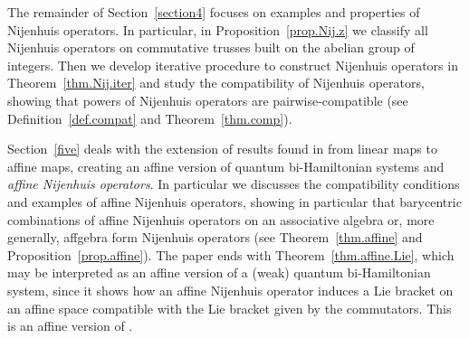 \documentclass[10pt,a4paper]{amsart}
\numberwithin{equation}{section}
\begin{document}
The remainder of Section~\ref{section4} focuses on examples and properties of Nijenhuis operators.
In particular, in Proposition~\ref{prop.Nij.z} we classify all Nijenhuis operators on commutative trusses built on the abelian group of integers. Then we develop iterative procedure to construct Nijenhuis operators in Theorem~\ref{thm.Nij.iter} and study the compatibility of Nijenhuis operators, showing that powers of Nijenhuis operators are pairwise-compatible (see Definition~\ref{def.compat} and Theorem~\ref{thm.comp}).

Section~\ref{five} deals with the extension of results found in \cite{4} from linear maps to affine maps, creating an affine version of quantum bi-Hamiltonian systems and \textit{affine Nijenhuis operators}.
In particular we discusses the compatibility conditions and examples of affine Nijenhuis operators, showing in particular that barycentric combinations of affine Nijenhuis operators on an associative algebra or, more generally, affgebra form Nijenhuis operators (see Theorem~\ref{thm.affine} and Proposition~\ref{prop.affine}). The paper ends with Theorem~\ref{thm.affine.Lie}, which may be interpreted as an affine version of a (weak) quantum bi-Hamiltonian system, since it shows how an affine Nijenhuis operator induces a Lie bracket on an affine space compatible with the Lie bracket given by the commutators. This is an affine version of \cite[Theorem~8]{4}.
\end{document}
